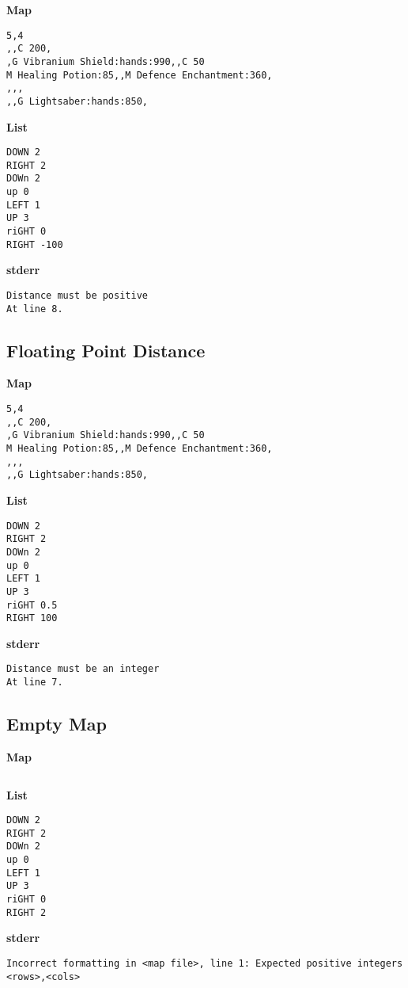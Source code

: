 \documentclass{article}
\begin{document}
\quad \textbf{Map}
\begin{lstlisting}
5,4
,,C 200,
,G Vibranium Shield:hands:990,,C 50
M Healing Potion:85,,M Defence Enchantment:360,
,,,
,,G Lightsaber:hands:850,
\end{lstlisting}

\textbf{List}
\begin{lstlisting}
DOWN 2
RIGHT 2
DOWn 2
up 0
LEFT 1
UP 3
riGHT 0
RIGHT -100
\end{lstlisting}
\pagebreak

\textbf{stderr}
\begin{lstlisting}
Distance must be positive
At line 8.
\end{lstlisting}

\subsection{Floating Point Distance}

\quad \textbf{Map}
\begin{lstlisting}
5,4
,,C 200,
,G Vibranium Shield:hands:990,,C 50
M Healing Potion:85,,M Defence Enchantment:360,
,,,
,,G Lightsaber:hands:850,
\end{lstlisting}

\textbf{List}
\begin{lstlisting}
DOWN 2
RIGHT 2
DOWn 2
up 0
LEFT 1
UP 3
riGHT 0.5
RIGHT 100
\end{lstlisting}
\pagebreak

\textbf{stderr}
\begin{lstlisting}
Distance must be an integer
At line 7.
\end{lstlisting}

\subsection{Empty Map}

\quad \textbf{Map}
\begin{lstlisting}

\end{lstlisting}

\textbf{List}
\begin{lstlisting}
DOWN 2
RIGHT 2
DOWn 2
up 0
LEFT 1
UP 3
riGHT 0
RIGHT 2
\end{lstlisting}
\pagebreak

\textbf{stderr}
\begin{lstlisting}
Incorrect formatting in <map file>, line 1: Expected positive integers <rows>,<cols>
\end{lstlisting}
\end{document}
